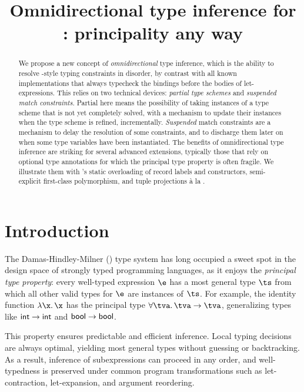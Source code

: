 \documentclass[acmsmall,screen,nonacm,review]{acmart}
\title{Omnidirectional type inference for \ML: principality any way}
\begin{document}
\begin{abstract}
We propose a new concept of \emph{omnidirectional} type inference, which is
the ability to resolve \ML-style typing constraints in disorder, by
contrast with all known implementations that always typecheck the
bindings before the bodies of let-expressions.
%
This relies on two technical devices: \emph{partial type schemes}
and \emph{suspended match constraints}. Partial here means the
possibility of taking instances of a type scheme that is not yet
completely solved, with a mechanism to update their instances when
the type scheme is refined, incrementally.
\emph{Suspended} match constraints are a mechanism to delay the resolution of
some constraints, and to discharge them later on when some type
variables have been instantiated.
%
The benefits of omnidirectional type inference are striking for several
advanced \ML extensions, typically those that rely on optional type
annotations for which the principal type property is often fragile.  We
illustrate them with \OCaml's static overloading of record labels and
constructors, semi-explicit first-class polymorphism, and tuple projections
\`a la \SML.
\end{abstract}
\maketitle

\section{Introduction}
\label{sec/introduction}


The Damas-Hindley-Milner (\HM) \cite{Damas-Milner/W@popl82} type system has
long occupied a sweet spot in the design space of strongly typed programming
languages, as it enjoys the \emph{principal type property}: every well-typed
expression $\e$ has a most general type $\ts$ from which all other valid
types for $\e$ are instances of $\ts$. For example, the identity function
$\efun \x \x$ has the principal type $\tfor \tv \tv \to \tv$, generalizing
types like $\mathsf{int} \to \mathsf{int}$ and $\mathsf{bool} \to \mathsf{bool}$.


This property ensures predictable and efficient inference. Local typing
decisions are always optimal, yielding most general types without guessing or
backtracking. As a result, inference of subexpressions can proceed in any
order, and well-typedness is preserved under common program transformations
such as let-contraction, let-expansion, and argument reordering.
\end{document}
